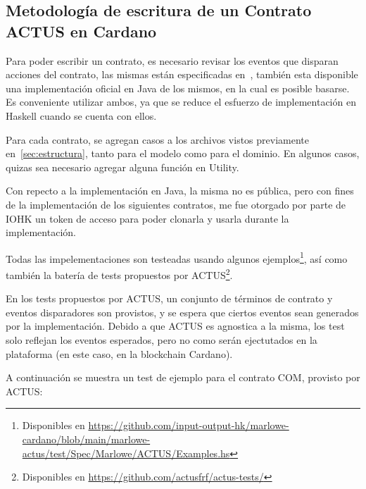 \documentclass[12pt]{book}
\begin{document}
\subsection{Metodología de escritura de un Contrato ACTUS en Cardano}

Para poder escribir un contrato, es necesario revisar los eventos que disparan acciones del contrato, las mismas están especificadas en~\cite{ACTUS_Techspecs}, también esta disponible una implementación oficial en Java de los mismos, en la cual es posible basarse. Es conveniente utilizar ambos, ya que se reduce el esfuerzo de implementación en Haskell cuando se cuenta con ellos.

Para cada contrato, se agregan casos a los archivos vistos previamente en~\ref{sec:estructura}, tanto para el modelo como para el dominio. En algunos casos, quizas sea necesario agregar alguna función en Utility.

Con repecto a la implementación en Java, la misma no es pública, pero con fines de la implementación de los siguientes contratos, me fue otorgado por parte de IOHK un token de acceso para poder clonarla y usarla durante la implementación.

Todas las impelementaciones son testeadas usando algunos ejemplos\footnote{Disponibles en \href{https://github.com/input-output-hk/marlowe-cardano/blob/main/marlowe-actus/test/Spec/Marlowe/ACTUS/Examples.hs}{https://github.com/input-output-hk/marlowe-cardano/blob/main/marlowe-actus/test/Spec/Marlowe/ACTUS/Examples.hs}}, así como también la batería de tests propuestos por ACTUS\footnote{Disponibles en \href{https://github.com/actusfrf/actus-tests/}{https://github.com/actusfrf/actus-tests/}}.

En los tests propuestos por ACTUS, un conjunto de términos de contrato y eventos disparadores son provistos, y se espera que ciertos eventos sean generados por la implementación. Debido a que ACTUS es agnostica a la misma, los test solo reflejan los eventos esperados, pero no como serán ejectutados en la plataforma (en este caso, en la blockchain Cardano).

A continuación se muestra un test de ejemplo para el contrato COM, provisto por ACTUS:\@
\end{document}
